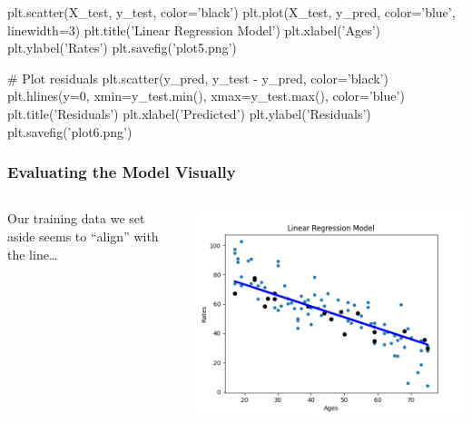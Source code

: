 \documentclass{beamer}
\newcounter{slidenum}
\begin{document}
\begin{pycode}
plt.scatter(X_test, y_test, color='black')
plt.plot(X_test, y_pred, color='blue', linewidth=3)
plt.title('Linear Regression Model')
plt.xlabel('Ages')
plt.ylabel('Rates')
plt.savefig('plot5.png')

# Plot residuals
plt.scatter(y_pred, y_test - y_pred, color='black')
plt.hlines(y=0, xmin=y_test.min(), xmax=y_test.max(), color='blue')
plt.title('Residuals')
plt.xlabel('Predicted')
plt.ylabel('Residuals')
plt.savefig('plot6.png')
\end{pycode}
\begin{frame}
	\frametitle{Evaluating the Model Visually}
	\begin{columns}
Our training data we set aside seems to ``align'' with the line\ldots

\includegraphics[width=\textwidth]{plot5.png}
\end{columns}
\end{frame}
\end{document}
